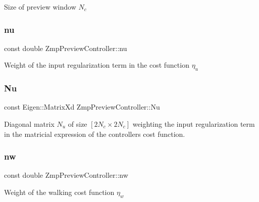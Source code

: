 Size of preview window $ N_c $ \hypertarget{classZmpPreviewController_ac611f084023404faba1ccfab573cd81d}{}\label{classZmpPreviewController_ac611f084023404faba1ccfab573cd81d} 
\subsubsection{\texorpdfstring{nu}{nu}}
{\footnotesize\ttfamily const double Zmp\+Preview\+Controller\+::nu\hspace{0.3cm}{\ttfamily [private]}}

Weight of the input regularization term in the cost function $\eta_u$ \hypertarget{classZmpPreviewController_ac3e92145988993ede7ce2060b997c8db}{}\label{classZmpPreviewController_ac3e92145988993ede7ce2060b997c8db} 
\subsubsection{\texorpdfstring{Nu}{Nu}}
{\footnotesize\ttfamily const Eigen\+::\+Matrix\+Xd Zmp\+Preview\+Controller\+::\+Nu\hspace{0.3cm}{\ttfamily [private]}}

Diagonal matrix $N_u$ of size $[2N_c \times 2N_c]$ weighting the input regularization term in the matricial expression of the controller\textquotesingle{}s cost function. \hypertarget{classZmpPreviewController_a783427b817d77469e1f80426bede5310}{}\label{classZmpPreviewController_a783427b817d77469e1f80426bede5310} 
\subsubsection{\texorpdfstring{nw}{nw}}
{\footnotesize\ttfamily const double Zmp\+Preview\+Controller\+::nw\hspace{0.3cm}{\ttfamily [private]}}

Weight of the walking cost function $ \eta_w $ \hypertarget{classZmpPreviewController_a5e85354a1a7c3f2a8e265dbe7367051c}{}\label{classZmpPreviewController_a5e85354a1a7c3f2a8e265dbe7367051c} 
